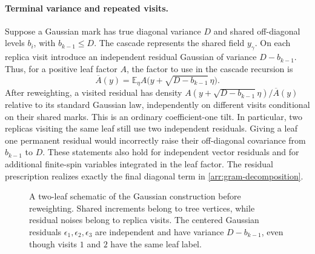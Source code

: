 \paragraph{Terminal variance and repeated visits.}
Suppose a Gaussian mark has true diagonal variance $D$ and shared
off-diagonal levels $b_i$, with $b_{k-1}\leq D$.  The cascade represents
the shared field $y_\gamma$.  On each replica visit introduce an
independent residual Gaussian of variance $D-b_{k-1}$.  Thus, for a
positive leaf factor $A$, the factor to use in the cascade recursion is
\begin{equation}
 \overline A(y)=\mathbb E_\eta
   A\bigl(y+\sqrt{D-b_{k-1}}\,\eta\bigr).
 \label{arr:residual-average}
\end{equation}
After reweighting, a visited residual has density
$A(y+\sqrt{D-b_{k-1}}\eta)/\overline A(y)$ relative to its standard
Gaussian law, independently on different visits conditional on their
shared marks.  This is an ordinary coefficient-one tilt.  In particular,
two replicas visiting the same leaf still use two independent residuals.
Giving a leaf one permanent residual would incorrectly raise their
off-diagonal covariance from $b_{k-1}$ to $D$.  These statements also hold
for independent vector residuals and for additional finite-spin variables
integrated in the leaf factor.  The residual prescription realizes
exactly the final diagonal term in \eqref{arr:gram-decomposition}.

\begin{figure}[tb]
 \centering
 \caption{A two-leaf schematic of the Gaussian construction before
 reweighting. Shared increments
 belong to tree vertices, while residual noises belong to replica visits.
 The centered Gaussian residuals $\epsilon_1,\epsilon_2,\epsilon_3$ are
 independent and have variance $D-b_{k-1}$, even though visits $1$ and $2$
 have the same leaf label.}
 \label{arr:residual-figure}
\end{figure}

